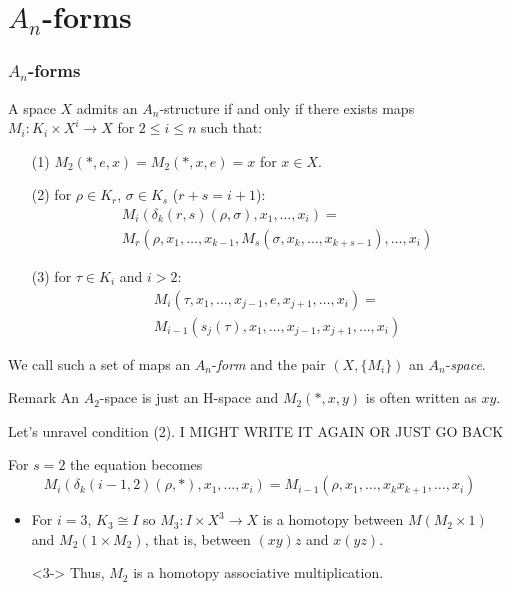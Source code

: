 \documentclass{beamer}
\theoremstyle{definition}
\begin{document}
\section{$A_n$-forms}
\begin{frame}
\frametitle{$A_n$-forms}
\begin{theorem}
A space $X$ admits an $A_n$-structure if and only if there exists maps $M_i:K_i\times X^i\to X$ for $2\leq i\leq n$ such that:
\begin{itemize}
\item[(1)] $M_2(*,e,x)=M_2(*,x,e)=x$ for $x\in X$. %
\item[(2)] for $\rho\in K_r$, $\sigma\in K_s$ ($r+s=i+1$):
\begin{align*}
&M_i(\delta_k(r,s)(\rho,\sigma),x_1,\dots, x_i)=\\
&M_r(\rho,x_1,\dots, x_{k-1},M_s(\sigma,x_k,\dots, x_{k+s-1}),\dots, x_i)
\end{align*} %
\item[(3)] for $\tau\in K_i$ and $i>2$:
\begin{align*}
&M_i(\tau,x_1,\dots, x_{j-1},e,x_{j+1},\dots, x_i)=\\
&M_{i-1}(s_j(\tau),x_1,\dots, x_{j-1},x_{j+1},\dots, x_i)
\end{align*}%
\end{itemize}
\end{theorem}
\end{frame}

\begin{frame}
We call such a set of maps an $A_n$-\emph{form} and the pair $(X,\{M_i\})$ an $A_n$-\emph{space}.\pause
\begin{block}{Remark}
An $A_2$-space is just an H-space and $M_2(*,x,y)$ is often written as $xy$.
\end{block}\pause
Let's unravel condition (2). I MIGHT WRITE IT AGAIN OR JUST GO BACK
\end{frame}
\begin{frame}
For $s=2$ the equation becomes
\[
M_i(\delta_k(i-1,2)(\rho,*),x_1,\dots, x_i)=M_{i-1}(\rho,x_1,\dots,x_kx_{k+1},\dots, x_i)
\]
\begin{itemize}
\item<2-> For $i=3$, $K_3\cong I$ so $M_3:I\times X^3\to X$ is a homotopy between $M(M_2\times 1)$ and $M_2(1\times M_2)$, that is, between $(xy)z$ and $x(yz)$.
\item[]<3-> Thus, $M_2$ is a homotopy associative multiplication.
\end{itemize}

\end{frame}
\end{document}
